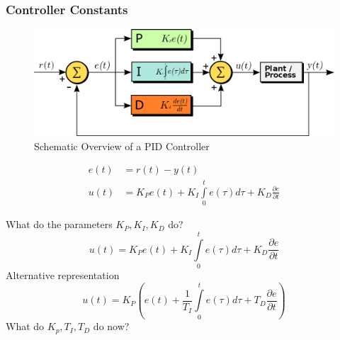 \subsubsection{Controller Constants}
\label{subsec:concepts-controller-constant-discussion}
\begin{frame}{\insertsubsubsection}
	\begin{figure}
		\centering
		\includegraphics[width=\textwidth]{media/PID_en}
		\caption{Schematic Overview of a PID Controller~\cite{wikiPID2011}}
	\end{figure}
	\begin{align}
		e(t) &= r(t) - y(t)\\
		u(t) &= K_P e(t) + K_I \int\limits^t_0 e(\tau)d\tau + K_D \frac{\partial e}{\partial t}
	\end{align}
\end{frame}
%
%
\begin{frame}{\insertsubsubsection}
	What do the parameters $K_P, K_I, K_D$ do?
	\begin{equation}
		u(t) = K_P e(t) + K_I \int\limits^t_0 e(\tau)d\tau + K_D \frac{\partial e}{\partial t}
	\end{equation}
	Alternative representation
	\begin{equation}
		u(t) = K_P \left(e(t) + \frac{1}{T_I}\int\limits^t_0 e(\tau)d\tau + T_D\frac{\partial e}{\partial t}\right)
	\end{equation}
	What do $K_p,T_I,T_D$ do now?
\end{frame}